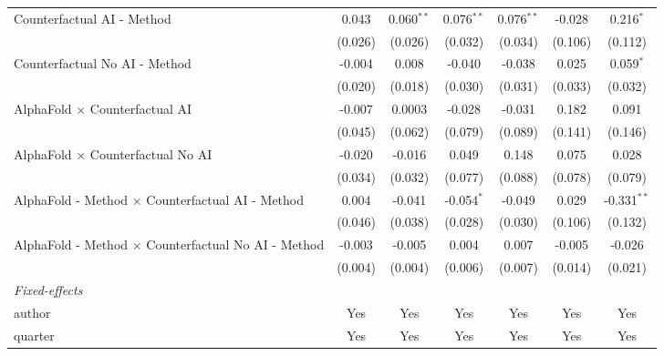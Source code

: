\begin{tabular}{lcccccc}
   Counterfactual AI - Method                                 & 0.043   & 0.060$^{**}$ & 0.076$^{**}$ & 0.076$^{**}$ & -0.028  & 0.216$^{*}$\\   
                                                              & (0.026) & (0.026)      & (0.032)      & (0.034)      & (0.106) & (0.112)\\   
   Counterfactual No AI - Method                              & -0.004  & 0.008        & -0.040       & -0.038       & 0.025   & 0.059$^{*}$\\   
                                                              & (0.020) & (0.018)      & (0.030)      & (0.031)      & (0.033) & (0.032)\\   
   AlphaFold $\times$ Counterfactual AI                       & -0.007  & 0.0003       & -0.028       & -0.031       & 0.182   & 0.091\\   
                                                              & (0.045) & (0.062)      & (0.079)      & (0.089)      & (0.141) & (0.146)\\   
   AlphaFold $\times$ Counterfactual No AI                    & -0.020  & -0.016       & 0.049        & 0.148        & 0.075   & 0.028\\   
                                                              & (0.034) & (0.032)      & (0.077)      & (0.088)      & (0.078) & (0.079)\\   
   AlphaFold - Method $\times$ Counterfactual AI - Method     & 0.004   & -0.041       & -0.054$^{*}$ & -0.049       & 0.029   & -0.331$^{**}$\\   
                                                              & (0.046) & (0.038)      & (0.028)      & (0.030)      & (0.106) & (0.132)\\   
   AlphaFold - Method $\times$ Counterfactual No AI - Method  & -0.003  & -0.005       & 0.004        & 0.007        & -0.005  & -0.026\\   
                                                              & (0.004) & (0.004)      & (0.006)      & (0.007)      & (0.014) & (0.021)\\   
   \midrule
   \emph{Fixed-effects}\\
   author                                                     & Yes     & Yes          & Yes          & Yes          & Yes     & Yes\\  
   quarter                                                    & Yes     & Yes          & Yes          & Yes          & Yes     & Yes\\  

\end{tabular}
